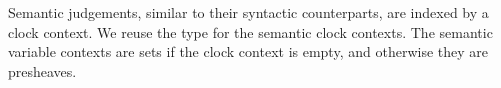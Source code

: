 
Semantic judgements, similar to their syntactic counterparts, are indexed by
a clock context. We reuse the type  for the semantic
clock contexts.
The semantic variable contexts are sets if the clock context is empty, and
otherwise they are presheaves.
\begin{code}%
\>[0]\AgdaSpace{}%
\AgdaSymbol{:}\AgdaSpace{}%
\AgdaSpace{}%
\AgdaSpace{}%
\<%
\\
\>[0]\AgdaSpace{}%
\AgdaSpace{}%
\AgdaSymbol{=}\AgdaSpace{}%
\<%
\\
\>[0]\AgdaSpace{}%
\AgdaSpace{}%
\AgdaSymbol{=}\AgdaSpace{}%
\<%
\end{code}
